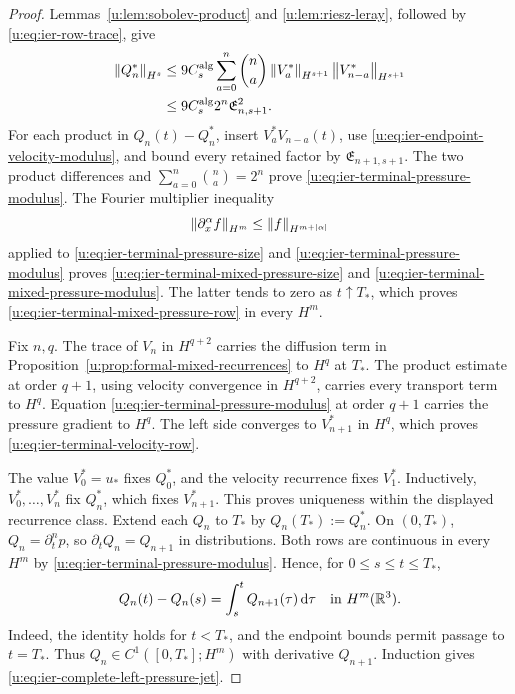 \begin{proof}
Lemmas~\ref{u:lem:sobolev-product} and \ref{u:lem:riesz-leray}, followed by
\eqref{u:eq:ier-row-trace}, give
\begin{align*}
 \left\lVert Q_n^*\right\rVert_{H^s}
 &\le9C_s^{\rm alg}\sum_{a=0}^{n}\binom na
 \left\lVert V_a^*\right\rVert_{H^{s+1}}\left\lVert V_{n-a}^*\right\rVert_{H^{s+1}}\\
 &\le9C_s^{\rm alg}2^n\mathfrak E_{n,s+1}^2.
\end{align*}
For each product in \(Q_n(t)-Q_n^*\), insert
\(V_a^*V_{n-a}(t)\), use
\eqref{u:eq:ier-endpoint-velocity-modulus}, and bound every retained factor by
\(\mathfrak E_{n+1,s+1}\).  The two product differences and
\(\sum_{a=0}^{n}\binom na=2^n\) prove
\eqref{u:eq:ier-terminal-pressure-modulus}.  The Fourier multiplier inequality
\[
 \left\lVert \partial_x^\alpha f\right\rVert_{H^m}
 \le\left\lVert f\right\rVert_{H^{m+|\alpha|}}
\]
applied to \eqref{u:eq:ier-terminal-pressure-size} and
\eqref{u:eq:ier-terminal-pressure-modulus} proves
\eqref{u:eq:ier-terminal-mixed-pressure-size} and
\eqref{u:eq:ier-terminal-mixed-pressure-modulus}.  The latter tends to zero
as \(t\uparrow T_*\), which proves
\eqref{u:eq:ier-terminal-mixed-pressure-row} in every \(H^m\).

Fix \(n,q\).  The trace of \(V_n\) in \(H^{q+2}\) carries the diffusion
term in Proposition~\ref{u:prop:formal-mixed-recurrences} to \(H^q\) at
\(T_*\).  The product estimate at order \(q+1\), using velocity convergence
in \(H^{q+2}\), carries every transport term to \(H^q\).  Equation
\eqref{u:eq:ier-terminal-pressure-modulus} at order \(q+1\) carries the pressure
gradient to \(H^q\).  The left side converges to \(V_{n+1}^*\) in \(H^q\),
which proves \eqref{u:eq:ier-terminal-velocity-row}.

The value \(V_0^*=u_*\) fixes \(Q_0^*\), and the velocity recurrence fixes
\(V_1^*\).  Inductively, \(V_0^*,\ldots,V_n^*\) fix \(Q_n^*\), which fixes
\(V_{n+1}^*\).  This proves uniqueness within the displayed recurrence
class.  Extend each \(Q_n\) to \(T_*\) by
\(Q_n(T_*):=Q_n^*\).  On \((0,T_*)\),
\(Q_n=\partial_t^np\), so \(\partial_tQ_n=Q_{n+1}\) in distributions.
Both rows are continuous in every \(H^m\) by
\eqref{u:eq:ier-terminal-pressure-modulus}.  Hence, for
\(0\le s\le t\le T_*\),
\begin{equation}
 Q_n(t)-Q_n(s)=\int_s^tQ_{n+1}(\tau)\,\mathrm d\tau
 \quad\text{in }H^m(\mathbb R^3).
 \label{u:eq:ier-pressure-banach-identity}
\end{equation}
Indeed, the identity holds for \(t<T_*\), and the endpoint bounds permit
passage to \(t=T_*\).  Thus
\(Q_n\in C^1([0,T_*];H^m)\) with derivative \(Q_{n+1}\).  Induction gives
\eqref{u:eq:ier-complete-left-pressure-jet}.
\end{proof}

